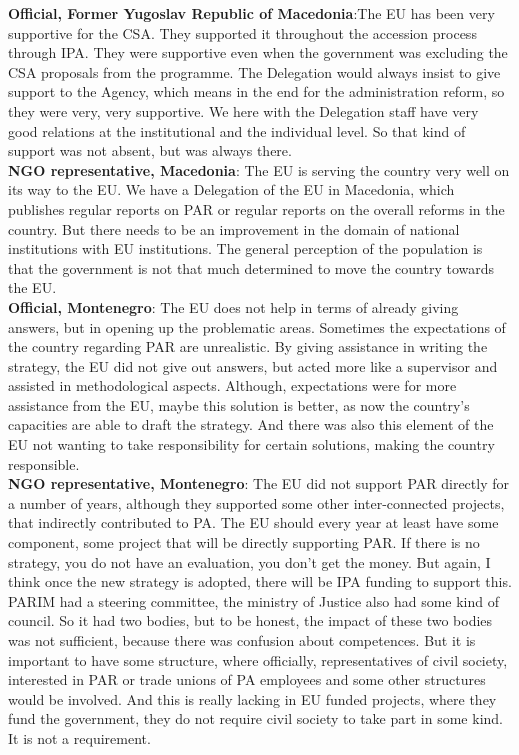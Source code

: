 \textbf{Official, Former Yugoslav Republic of Macedonia}:The EU has been very supportive for the CSA. They supported it throughout the accession process through IPA. They were supportive even when the government was excluding the CSA proposals from the programme. The Delegation would always insist to give support to the Agency, which means in the end for the administration reform, so they were very, very supportive. We here with the Delegation staff have very good relations at the institutional and the individual level. So that kind of support was not absent, but was always there. \\
\textbf{NGO representative, Macedonia}: The EU is serving the country very well on its way to the EU. We have a Delegation of the EU in Macedonia, which publishes regular reports on PAR or regular reports on the overall reforms in the country. But there needs to be an improvement in the domain of national institutions with EU institutions. The general perception of the population is that the government is not that much determined to move the country towards the EU.  \\
\textbf{Official, Montenegro}: The EU does not help in terms of already giving answers, but in opening up the problematic areas. Sometimes the expectations of the country regarding PAR are unrealistic. By giving assistance in writing the strategy, the EU did not give out answers, but acted more like a supervisor and assisted in methodological aspects. Although, expectations were for more assistance from the EU, maybe this solution is better, as now the country’s capacities are able to draft the strategy. And there was also this element of the EU not wanting to take responsibility for certain solutions, making the country responsible.  \\
\textbf{NGO representative, Montenegro}: The EU did not support PAR directly for a number of years, although they supported some other inter-connected projects, that indirectly contributed to PA. The EU should every year at least have some component, some project that will be directly supporting PAR. If there is no strategy, you do not have an evaluation, you don’t get the money. But again, I think once the new strategy is adopted, there will be IPA funding to support this. PARIM had a steering committee, the ministry of Justice also had some kind of council. So it had two bodies, but to be honest, the impact of these two bodies was not sufficient, because there was confusion about competences. But it is important to have some structure, where officially, representatives of civil society, interested in PAR or trade unions of PA employees and some other structures would be involved. And this is really lacking in EU funded projects, where they fund the government, they do not require civil society to take part in some kind. It is not a requirement.%
